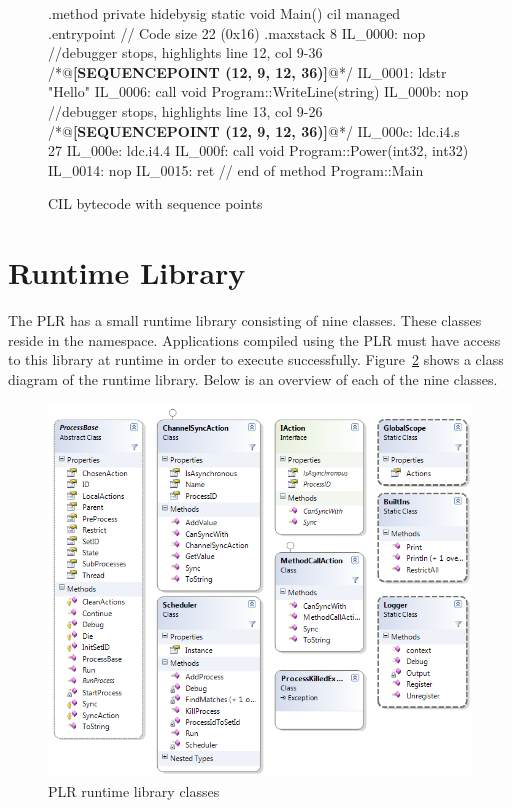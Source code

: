 	\begin{figure}
	\begin{cil} 
.method private hidebysig static void  Main() cil managed
{
  .entrypoint
  // Code size       22 (0x16)
  .maxstack  8
  IL_0000:  nop
//debugger stops, highlights line 12, col 9-36
/*@\textbf{[SEQUENCEPOINT (12, 9, 12, 36)]}@*/
  IL_0001:  ldstr      "Hello"
  IL_0006:  call       void Program::WriteLine(string)
  IL_000b:  nop
//debugger stops, highlights line 13, col 9-26
/*@\textbf{[SEQUENCEPOINT (12, 9, 12, 36)]}@*/
  IL_000c:  ldc.i4.s   27
  IL_000e:  ldc.i4.4
  IL_000f:  call       void Program::Power(int32, int32)
  IL_0014:  nop
  IL_0015:  ret
} // end of method Program::Main
  \end{cil}
  \caption{CIL bytecode with sequence points}
  \label{fig:sequence_points}
	\end{figure}
	
\section{Runtime Library}

	The PLR has a small runtime library consisting of nine classes. These classes
	reside in the  namespace. Applications compiled using 
	the PLR must have access to this library at runtime in order to execute 
	successfully. Figure~\ref{fig:runtime_library} shows a class diagram of the 
	runtime library. Below is an overview of each of the nine classes.

	\begin{figure}[ht!]
		\centering
		\includegraphics[scale=0.5]{RuntimeLibrary.png}
		\caption{PLR runtime library classes}
		\label{fig:runtime_library}
	\end{figure}

